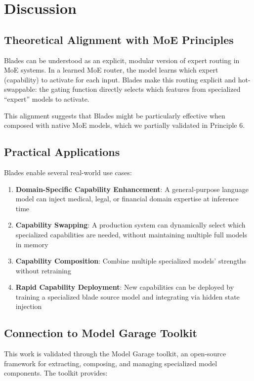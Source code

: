 \documentclass[11pt,a4paper]{article}
\begin{document}
\section{Discussion}

\subsection{Theoretical Alignment with MoE Principles}

Blades can be understood as an explicit, modular version of expert routing in MoE systems. In a learned MoE router, the model learns which expert (capability) to activate for each input. Blades make this routing explicit and hot-swappable: the gating function directly selects which features from specialized ``expert'' models to activate.

This alignment suggests that Blades might be particularly effective when composed with native MoE models, which we partially validated in Principle 6.

\subsection{Practical Applications}

Blades enable several real-world use cases:

\begin{enumerate}
    \item \textbf{Domain-Specific Capability Enhancement}: A general-purpose language model can inject medical, legal, or financial domain expertise at inference time
    \item \textbf{Capability Swapping}: A production system can dynamically select which specialized capabilities are needed, without maintaining multiple full models in memory
    \item \textbf{Capability Composition}: Combine multiple specialized models' strengths without retraining
    \item \textbf{Rapid Capability Deployment}: New capabilities can be deployed by training a specialized blade source model and integrating via hidden state injection
\end{enumerate}

\subsection{Connection to Model Garage Toolkit}

This work is validated through the Model Garage toolkit, an open-source framework for extracting, composing, and managing specialized model components. The toolkit provides:
\end{document}
